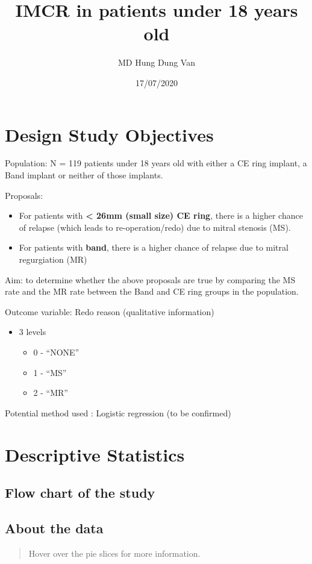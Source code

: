 \documentclass[]{article}
\title{IMCR in patients under 18 years old}
\author{MD Hung Dung Van}
\date{17/07/2020}
\providecommand{\tightlist}{%
  \setlength{\itemsep}{0pt}\setlength{\parskip}{0pt}}
\begin{document}
\maketitle

{
\setcounter{tocdepth}{2}
\tableofcontents
}
\hypertarget{design-study-objectives}{%
\section{Design Study Objectives}\label{design-study-objectives}}

{Population}: N = 119 patients under 18 years old with either a CE ring implant, a Band implant or neither of those implants.

{Proposals}:

\begin{itemize}
\tightlist
\item
  For patients with \textbf{\textless{} 26mm (small size) CE ring}, there is a higher chance of relapse (which leads to re-operation/redo) due to {mitral stenosis (MS)}.
\item
  For patients with \textbf{band}, there is a higher chance of relapse due to {mitral regurgiation (MR)}
\end{itemize}

{Aim}: to determine whether the above proposals are true by comparing the MS rate and the MR rate between the Band and CE ring groups in the population.

{Outcome variable}: Redo reason (qualitative information)

\begin{itemize}
\tightlist
\item
  3 levels

  \begin{itemize}
  \tightlist
  \item
    0 - ``NONE''
  \item
    1 - ``MS''
  \item
    2 - ``MR''
  \end{itemize}
\end{itemize}

{Potential method used} : Logistic regression (to be confirmed)

\hypertarget{descriptive-statistics}{%
\section{Descriptive Statistics}\label{descriptive-statistics}}

\hypertarget{flow-chart-of-the-study}{%
\subsection{Flow chart of the study}\label{flow-chart-of-the-study}}

\hypertarget{about-the-data}{%
\subsection{About the data}\label{about-the-data}}

\begin{quote}
Hover over the pie slices for more information.
\end{quote}

\hypertarget{htmlwidget-a5d7c1eb10ff43d9a992}{}
\begin{highchart}

\end{highchart}
\end{document}
